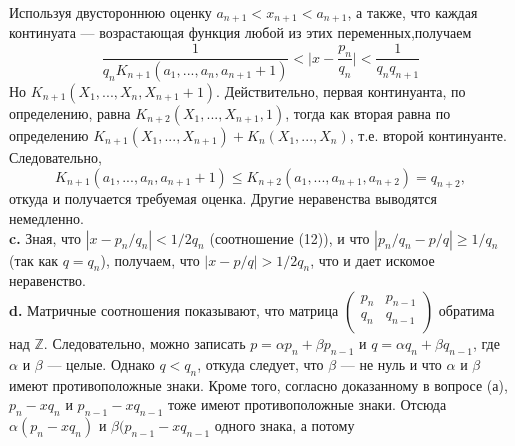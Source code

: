\documentclass{mai_book}
\begin{document}
\noindent
Используя двустороннюю оценку $a_{n+1}<x_{n+1}<a_{n+1}$, а также, что каждая\linebreak
континуата --- возрастающая функция любой из этих переменных,\linebreak получаем
$$\frac{1}{q_nK_{n+1}(a_1,...,a_n,a_{n+1}+1)}<\bigg|x-\frac{p_n}{q_n}\bigg|<\frac{1}{q_nq_{n+1}}$$
Но $K_{n+1}(X_1,...,X_n,X_{n+1}+1)$. Действительно, первая континуанта, по\linebreak
определению, равна $K_{n+2}(X_1,...,X_{n+1},1)$, тогда как вторая равна по\linebreak
определению $K_{n+1}(X_1,...,X_{n+1})+K_n(X_1,...,X_n)$, \:\:т.е. второй континуанте.\linebreak
Следовательно,
$$ K_{n+1}(a_1,...,a_n,a_{n+1}+1)\leqslant K_{n+2}(a_1,...,a_{n+1},a_{n+2})=q_{n+2},$$
откуда и получается требуемая оценка. Другие неравенства выводятся\linebreak
немедленно.\newline
\\
\hspace*{15pt}\textbf{c.} Зная, что $|x-p_n/q_n|<1/2q_n$ (соотношение (12)), и что\linebreak
$|p_n/q_n-p/q|\geqslant1/q_n$ (так как $q=q_n$), получаем, что $|x-p/q|>1/2q_n$,
что и дает искомое неравенство.\newline
\\
\hspace*{15pt}\textbf{d.} Матричные соотношения показывают, что матрица 
$\begin{pmatrix}
	p_n&  p_{n-1}\\
	q_n& q_{n-1}\\
\end{pmatrix}$\linebreak
обратима над $\mathbb{Z}$. Следовательно, можно записать $p=\alpha p_n+\beta p_{n-1}$ и \linebreak
$q=\alpha q_n+\beta q_{n-1}$, где $\alpha$ и $\beta$ — целые. Однако $q<q_n$, откуда следует,\linebreak
что $\beta$ — не нуль и что $\alpha$ и $\beta$ имеют противоположные знаки. Кроме\linebreak
того, согласно доказанному в вопросе (а), $p_n-xq_n$ и $p_{n-1}-xq_{n-1}$ тоже\linebreak
имеют противоположные знаки. Отсюда $\alpha(p_n-xq_n)$ и $\beta(p_{n-1}-xq_{n-1}$\linebreak
одного\:\: знака,\:\: а\:\: потому
\end{document}
